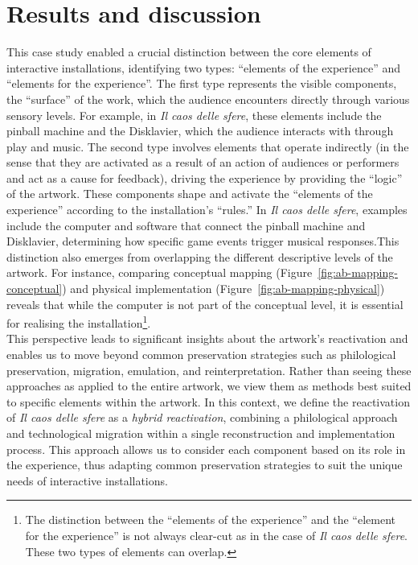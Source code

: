 \section{Results and discussion}
This case study enabled a crucial distinction between the core elements of interactive installations, identifying two types: ``elements of the experience'' and ``elements for the experience''. The first type represents the visible components, the ``surface'' of the work, which the audience encounters directly through various sensory levels. For example, in \textit{Il caos delle sfere}, these elements include the pinball machine and the Disklavier, which the audience interacts with through play and music. The second type involves elements that operate indirectly (in the sense that they are activated as a result of an action of audiences or performers and act as a cause for feedback), driving the experience by providing the ``logic'' of the artwork. These components shape and activate the ``elements of the experience'' according to the installation's ``rules.'' In \textit{Il caos delle sfere}, examples include the computer and software that connect the pinball machine and Disklavier, determining how specific game events trigger musical responses.This distinction also emerges from overlapping the different descriptive levels of the artwork. For instance, comparing conceptual mapping (Figure~\ref{fig:ab-mapping-conceptual}) and physical implementation (Figure~\ref{fig:ab-mapping-physical}) reveals that while the computer is not part of the conceptual level, it is essential for realising the installation\footnote{The distinction between the ``elements of the experience'' and the ``element for the experience'' is not always clear-cut as in the case of \textit{Il caos delle sfere}. These two types of elements can overlap.}.\\ 
This perspective leads to significant insights about the artwork's reactivation and enables us to move beyond common preservation strategies such as philological preservation, migration, emulation, and reinterpretation. Rather than seeing these approaches as applied to the entire artwork, we view them as methods best suited to specific elements within the artwork. In this context, we define the reactivation of \textit{Il caos delle sfere} as a \textit{hybrid reactivation}, combining a philological approach and technological migration within a single reconstruction and implementation process. This approach allows us to consider each component based on its role in the experience, thus adapting common preservation strategies to suit the unique needs of interactive installations.\\
